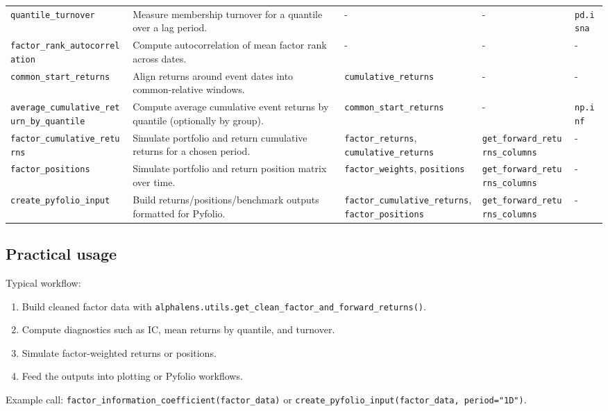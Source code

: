 \documentclass[11pt]{article}
\begin{document}
\begin{center}
\begin{tabular}{>{\raggedright\arraybackslash}p{2.8cm} >{\raggedright\arraybackslash}p{3.4cm} >{\raggedright\arraybackslash}p{3.0cm} >{\raggedright\arraybackslash}p{3.2cm} >{\raggedright\arraybackslash}p{2.5cm}}
\texttt{quantile\_turnover} & Measure membership turnover for a quantile over a lag period. & - & - & \texttt{pd.isna} \\
\texttt{factor\_rank\_autocorrelation} & Compute autocorrelation of mean factor rank across dates. & - & - & - \\
\texttt{common\_start\_returns} & Align returns around event dates into common-relative windows. & \texttt{cumulative\_returns} & - & - \\
\texttt{average\_cumulative\_return\_by\_quantile} & Compute average cumulative event returns by quantile (optionally by group). & \texttt{common\_start\_returns} & - & \texttt{np.inf} \\
\texttt{factor\_cumulative\_returns} & Simulate portfolio and return cumulative returns for a chosen period. & \texttt{factor\_returns}, \texttt{cumulative\_returns} & \texttt{get\_forward\_returns\_columns} & - \\
\texttt{factor\_positions} & Simulate portfolio and return position matrix over time. & \texttt{factor\_weights}, \texttt{positions} & \texttt{get\_forward\_returns\_columns} & - \\
\texttt{create\_pyfolio\_input} & Build returns/positions/benchmark outputs formatted for Pyfolio. & \texttt{factor\_cumulative\_returns}, \texttt{factor\_positions} & \texttt{get\_forward\_returns\_columns} & - \\
\bottomrule
\end{tabular}
\end{center}
\normalsize

\subsection{Practical usage}

Typical workflow:

\begin{enumerate}
  \item Build cleaned factor data with \texttt{alphalens.utils.get\_clean\_factor\_and\_forward\_returns()}.
  \item Compute diagnostics such as IC, mean returns by quantile, and turnover.
  \item Simulate factor-weighted returns or positions.
  \item Feed the outputs into plotting or Pyfolio workflows.
\end{enumerate}

Example call: \texttt{factor\_information\_coefficient(factor\_data)} or \texttt{create\_pyfolio\_input(factor\_data, period="1D")}.
\end{document}
